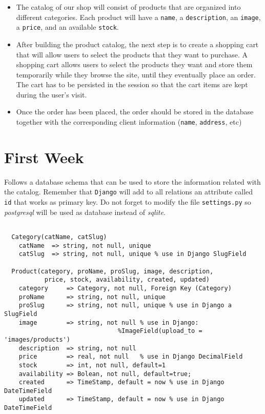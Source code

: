 \documentclass[12pt]{article} %
\newcommand{\ttt}[1]{\texttt{#1}}%
\newcommand{\settings}{\texttt{settings.py}}%
\newcommand{\django}{\texttt{Django}}%
\begin{document}
\begin{itemize}
    \item  The catalog of our shop will consist of products that are organized into different
categories. Each product will have a \ttt{name},  a \ttt{description},  an \ttt{image},
a \ttt{price}, and an available \ttt{stock}.
    \item After building the product catalog, the next step is to create a shopping cart that will allow users to select the products that they want to purchase. A shopping cart allows
users to select the products they want and store them temporarily while they browse
the site, until they eventually place an order. The cart has to be persisted in the
session so that the cart items are kept during the user's visit.
    \item Once the order has been placed, the order should be stored in the database together
    with the corresponding client information (\ttt{name}, \ttt{address}, etc)    
    
\end{itemize}

\section{First Week} %

Follows a database schema that can be used to store the information related with the catalog. 
Remember that \django{} will add to all relations an attribute called \ttt{id} that works as primary key. Do not forget to modify the file  \settings{} so \textit{postgresql} will be used as database instead of \textit{sqlite}.

\begin{verbatim}
  
  Category(catName, catSlug)
    catName  => string, not null, unique
    catSlug  => string, not null, unique % use in Django SlugField

  Product(category, proName, proSlug, image, description, 
           price, stock, availability, created, updated)
    category     => Category, not null, Foreign Key (Category)
    proName      => string, not null, unique
    proSlug      => string, not null, unique % use in Django a SlugField 
    image        => string, not null % use in Django: 
                               %ImageField(upload_to = 'images/products')
    description  => string, not null
    price        => real, not null   % use in Django DecimalField  
    stock        => int, not null, default=1
    availability => Bolean, not null, default=true; 
    created      => TimeStamp, default = now % use in Django DateTimeField
    updated      => TimeStamp, default = now % use in Django DateTimeField
      
\end{verbatim}
     
\end{document}
